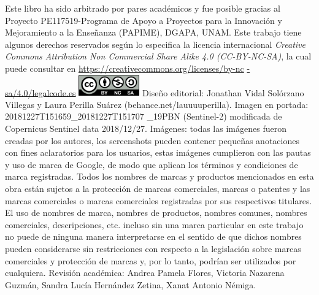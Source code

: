 \setlength{\columnsep}{25pt}
\begin{multicols*}{2}
    \raggedcolumns
    {\scriptsize Este libro ha sido arbitrado por pares académicos y fue posible gracias al Proyecto PE117519-Programa de Apoyo a Proyectos para la Innovación y Mejoramiento a la Enseñanza (PAPIME), DGAPA, UNAM. Este trabajo tiene algunos derechos reservados según lo especifica la licencia internacional {\it Creative Commons Attribution Non Commercial Share Alike 4.0 (CC-BY-NC-SA)}, la cual puede consultar en \href{https://creativecommons.org/licenses/by-nc-sa/4.0/legalcode.es}{https://creativecommons.org/licenses/by-nc} \href{https://creativecommons.org/licenses/by-nc -sa/4.0/legalcode.es}{-sa/4.0/legalcode.es}
    \linebreak
    \begingroup
        \includegraphics[height=26pt]{Img/license}
    \endgroup
    \newline Diseño editorial: Jonathan Vidal Solórzano Villegas y Laura Perilla Suárez (behance.net/lauuuuperilla).
    \newline Imagen en portada: 20181227T151659\_20181227T151707 \_19PBN (Sentinel-2) modificada de Copernicus Sentinel data 2018/12/27. 
    \newline Imágenes: todas las imágenes fueron creadas por los autores, los screenshots pueden contener pequeñas anotaciones con fines aclaratorios para los usuarios, estas imágenes cumplieron con las pautas y uso de marca de Google, de modo que aplican los términos y condiciones de marca registradas. 
    \newline Todos los nombres de marcas y productos mencionados en esta obra están sujetos a la protección de marcas comerciales, marcas o patentes y las marcas comerciales o marcas comerciales registradas por sus respectivos titulares. 
    El uso de nombres de marca, nombres de productos, nombres comunes, nombres comerciales, descripciones, etc. incluso sin una marca particular en este trabajo no puede de ninguna manera interpretarse en el sentido de que dichos nombres pueden considerarse sin restricciones con respecto a la legislación sobre marcas comerciales y protección de marcas y, por lo tanto, podrían ser utilizados por cualquiera.
    \newline Revisión académica: Andrea Pamela Flores, Victoria Nazarena Guzmán, Sandra Lucía Hernández Zetina, Xanat Antonio Némiga. \hspace*{\fill}
}
\end{multicols*}
